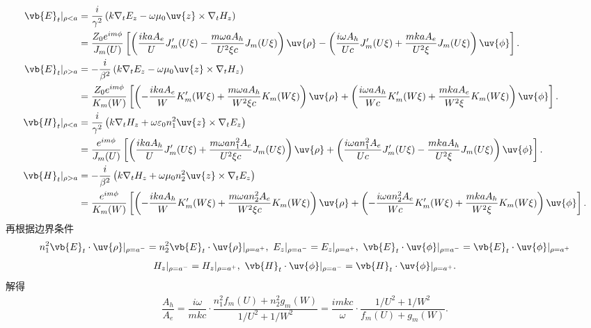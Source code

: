 \begin{align*}
	\vb{E}_t|_{\rho < a} &= \dfrac{i}{\gamma^2} \left( k \nabla_t E_z - \omega\mu_0 \uv{z} \times \nabla_t H_z \right) \\
	&= \dfrac{Z_0 e^{im\phi}}{J_m(U)}  \left[ \left( \dfrac{ika A_e}{U} J_m'(U\xi) - \dfrac{m\omega a A_h}{U^2 \xi c} J_m(U\xi) \right) \uv{\rho} - \left( \dfrac{i\omega A_h}{Uc} J_m'(U\xi) + \dfrac{mka A_e}{U^2 \xi} J_m(U\xi) \right) \uv{\phi} \right].\\
	\vb{E}_t|_{\rho > a} &= -\dfrac{i}{\beta^2} \left( k \nabla_t E_z - \omega\mu_0 \uv{z} \times \nabla_t H_z \right) \\
	&= \dfrac{Z_0 e^{im\phi}}{K_m(W)} \left[ \left( -\dfrac{ika A_e}{W} K_m'(W\xi) + \dfrac{m\omega a A_h}{W^2 \xi c} K_m(W\xi) \right) \uv{\rho} + \left( \dfrac{i\omega a A_h}{Wc} K_m'(W\xi) + \dfrac{mka A_e}{W^2 \xi} K_m(W\xi) \right) \uv{\phi} \right].\\
	\vb{H}_t|_{\rho < a} &= \dfrac{i}{\gamma^2} \left( k \nabla_t H_z + \omega\varepsilon_0 n_1^2 \uv{z} \times \nabla_t E_z \right) \\
	&= \dfrac{e^{im\phi}}{J_m(U)} \left[ \left( \dfrac{ika A_h}{U} J_m'(U\xi) + \dfrac{m\omega a n_1^2 A_e}{U^2 \xi c} J_m(U\xi) \right) \uv{\rho} + \left( \dfrac{i\omega a n_1^2 A_e}{Uc} J_m'(U\xi) - \dfrac{mka A_h}{U^2 \xi} J_m(U\xi) \right) \uv{\phi} \right].\\
	\vb{H}_t|_{\rho > a} &= -\dfrac{i}{\beta^2} \left( k \nabla_t H_z + \omega\mu_0 n_2^2 \uv{z} \times \nabla_t E_z \right) \\
	&= \dfrac{e^{im\phi}}{K_m(W)} \left[ \left( -\dfrac{ika A_h}{W} K_m'(W\xi) + \dfrac{m\omega a n_2^2 A_e}{W^2 \xi c} K_m(W\xi) \right) \uv{\rho} + \left( -\dfrac{i\omega a n_2^2 A_e}{Wc} K_m'(W\xi) + \dfrac{mka A_h}{W^2 \xi} K_m(W\xi) \right) \uv{\phi} \right].
\end{align*}
再根据边界条件
\begin{align*}
	n_1^2 \vb{E}_t \cdot \uv{\rho}|_{\rho = a^-} = n_2^2 \vb{E}_t \cdot \uv{\rho}|_{\rho = a^+},\,\,E_z|_{\rho = a^-} = E_z|_{\rho = a^+} ,\,\,\vb{E}_t \cdot \uv{\phi}|_{\rho = a^-} = \vb{E}_t \cdot \uv{\phi}|_{\rho = a^+}
\end{align*}\begin{align*}
	H_z|_{\rho = a^-} = H_z|_{\rho = a^+},\,\,\vb{H}_t \cdot \uv{\phi}|_{\rho = a^-} = \vb{H}_t \cdot \uv{\phi}|_{\rho = a^+}.
\end{align*}
解得
\begin{align*}
	\dfrac{A_h}{A_e} = \dfrac{i\omega}{mkc} \cdot \dfrac{n_1^2 f_m(U) + n_2^2 g_m(W)}{1/U^2 + 1/W^2} = \dfrac{imkc}{\omega} \cdot \dfrac{1/U^2 + 1/W^2}{f_m(U)+g_m(W)}.
\end{align*}
